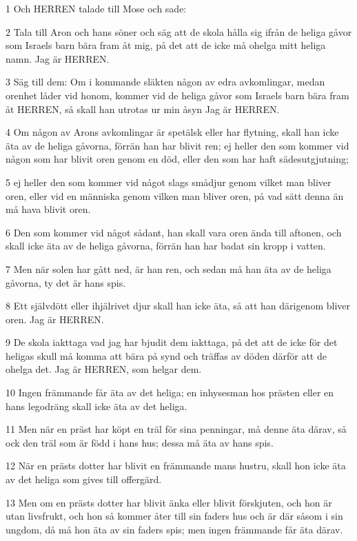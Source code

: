 \par 1 Och HERREN talade till Mose och sade:
\par 2 Tala till Aron och hans söner och säg att de skola hålla sig ifrån de heliga gåvor som Israels barn bära fram åt mig, på det att de icke må ohelga mitt heliga namn. Jag är HERREN.
\par 3 Säg till dem: Om i kommande släkten någon av edra avkomlingar, medan orenhet låder vid honom, kommer vid de heliga gåvor som Israels barn bära fram åt HERREN, så skall han utrotas ur min åsyn Jag är HERREN.
\par 4 Om någon av Arons avkomlingar är spetälsk eller har flytning, skall han icke äta av de heliga gåvorna, förrän han har blivit ren; ej heller den som kommer vid någon som har blivit oren genom en död, eller den som har haft sädesutgjutning;
\par 5 ej heller den som kommer vid något slags smådjur genom vilket man bliver oren, eller vid en människa genom vilken man bliver oren, på vad sätt denna än må hava blivit oren.
\par 6 Den som kommer vid något sådant, han skall vara oren ända till aftonen, och skall icke äta av de heliga gåvorna, förrän han har badat sin kropp i vatten.
\par 7 Men när solen har gått ned, är han ren, och sedan må han äta av de heliga gåvorna, ty det är hans spis.
\par 8 Ett självdött eller ihjälrivet djur skall han icke äta, så att han därigenom bliver oren. Jag är HERREN.
\par 9 De skola iakttaga vad jag har bjudit dem iakttaga, på det att de icke för det heligas skull må komma att bära på synd och träffas av döden därför att de ohelga det. Jag är HERREN, som helgar dem.
\par 10 Ingen främmande får äta av det heliga; en inhysesman hos prästen eller en hans legodräng skall icke äta av det heliga.
\par 11 Men när en präst har köpt en träl för sina penningar, må denne äta därav, så ock den träl som är född i hans hus; dessa må äta av hans spis.
\par 12 När en prästs dotter har blivit en främmande mans hustru, skall hon icke äta av det heliga som gives till offergärd.
\par 13 Men om en prästs dotter har blivit änka eller blivit förskjuten, och hon är utan livsfrukt, och hon så kommer åter till sin faders hus och är där såsom i sin ungdom, då må hon äta av sin faders spis; men ingen främmande får äta därav.
